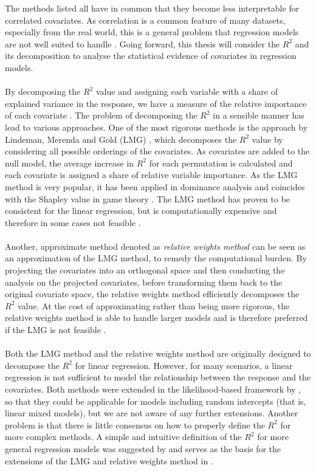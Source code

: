 The methods listed all have in common that they become less interpretable for correlated covariates. As correlation is a common feature of many datasets, especially from the real world, this is a general problem that regression models are not well suited to handle \citep{Gromping_2015}. Going forward, this thesis will consider the $R^2$ and its decomposition to analyse the statistical evidence of covariates in regression models.
\\
\\
By decomposing the $R^2$ value and assigning each variable with a share of explained variance in the response, we have a measure of the relative importance of each covariate \citep{gromping_relaimpo}. The problem of decomposing the $R^2$ in a sensible manner has lead to various approaches. One of the most rigorous methods is the approach by Lindeman, Merenda and Gold (LMG) \citep{Lindeman1980}, which decomposes the $R^2$ value by considering all possible orderings of the covariates. As covariates are added to the null model, the average increase in $R^2$ for each permutation is calculated and each covariate is assigned a share of relative variable importance. As the LMG method is very popular, it has been applied in dominance analysis \citep{budescu1993dominance} and coincides with the Shapley value in game theory \citep{Shapley1953StochasticG,Lipovetsky_GameTheory}. The LMG method has proven to be consistent for the linear regression, but is computationally expensive and therefore in some cases not feasible \citep{gromping_relaimpo}. 
\\
\\
Another, approximate method denoted as \textit{relative weights method} \citep{johnson_minimization_trace, Fabbris1980, Genizi_relative_weights} can be seen as an approximation of the LMG method, to remedy the computational burden. By projecting the covariates into an orthogonal space and then conducting the analysis on the projected covariates, before transforming them back to the original covariate space, the relative weights method efficiently decomposes the $R^2$ value. At the cost of approximating rather than being more rigorous, the relative weights method is able to handle larger models and is therefore preferred if the LMG is not feasible \citep{gromping_relaimpo}.
\\
\\ 
Both the LMG method and the relative weights method are originally designed to decompose the $R^2$ for linear regression. However, for many scenarios, a linear regression is not sufficient to model the relationship between the response and the covariates. Both methods were extended in the likelihood-based framework by \citet{matre}, so that they could be applicable for models including random intercepts (that is, linear mixed models), but we are not aware of any further extensions. Another problem is that there is little consensus on how to properly define the $R^2$ for more complex methods. A simple and intuitive definition of the $R^2$ for more general regression models was suggested by \citet{nakagawa2013general} and serves as the basis for the extensions of the LMG and relative weights method in \citet{matre}. 
